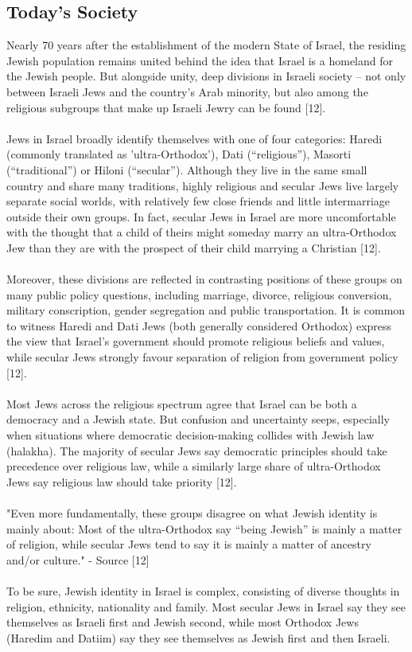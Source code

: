 \documentclass[10pt]{article}
\begin{document}
\subsection{Today's Society}
Nearly 70 years after the establishment of the modern State of Israel, the residing Jewish population remains united behind the idea that Israel is a homeland for the Jewish people. But alongside unity, deep divisions in Israeli society – not only between Israeli Jews and the country’s Arab minority, but also among the religious subgroups that make up Israeli Jewry can be found [12].
\\
\\
Jews in Israel broadly identify themselves with one of four categories: Haredi (commonly translated as 'ultra-Orthodox'), Dati (“religious”), Masorti (“traditional”) or Hiloni (“secular”). Although they live in the same small country and share many traditions, highly religious and secular Jews live largely separate social worlds, with relatively few close friends and little intermarriage outside their own groups. In fact, secular Jews in Israel are more uncomfortable with the thought that a child of theirs might someday marry an ultra-Orthodox Jew than they are with the prospect of their child marrying a Christian [12].
\\
\\
Moreover, these divisions are reflected in contrasting positions of these groups on many public policy questions, including marriage, divorce, religious conversion, military conscription, gender segregation and public transportation. It is common to witness Haredi and Dati Jews (both generally considered Orthodox) express the view that Israel’s government should promote religious beliefs and values, while secular Jews strongly favour separation of religion from government policy [12].
\\
\\
Most Jews across the religious spectrum agree that Israel can be both a democracy and a Jewish state. But confusion and uncertainty seeps, especially when situations where democratic decision-making collides with Jewish law (halakha). The majority of secular Jews say democratic principles should take precedence over religious law, while a similarly large share of ultra-Orthodox Jews say religious law should take priority [12].
\\
\\
"Even more fundamentally, these groups disagree on what Jewish identity is mainly about: Most of the ultra-Orthodox say “being Jewish” is mainly a matter of religion, while secular Jews tend to say it is mainly a matter of ancestry and/or culture." - Source [12]
\\
\\
To be sure, Jewish identity in Israel is complex, consisting of diverse thoughts in religion, ethnicity, nationality and family. Most secular Jews in Israel say they see themselves as Israeli first and Jewish second, while most Orthodox Jews (Haredim and Datiim) say they see themselves as Jewish first and then Israeli.
\end{document}

